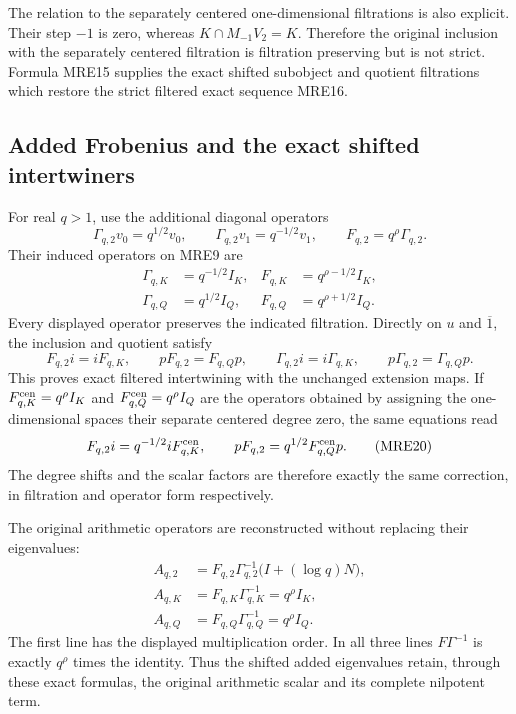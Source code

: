 The relation to the separately centered one-dimensional filtrations is
also explicit. Their step \(-1\) is zero, whereas
\(K\cap M_{-1}V_2=K\). Therefore the original inclusion with the separately
centered filtration is filtration preserving but is not strict. Formula
MRE15 supplies the exact shifted subobject and quotient filtrations
which restore the strict filtered exact sequence MRE16.

\subsection{Added Frobenius and the exact shifted intertwiners}

For real \(q>1\), use the additional diagonal operators
\[
 \Gamma_{q,2}v_0=q^{1/2}v_0,\qquad
 \Gamma_{q,2}v_1=q^{-1/2}v_1,\qquad
 F_{q,2}=q^\rho\Gamma_{q,2}.
 \tag{MRE17}
\]
Their induced operators on MRE9 are
\[
 \begin{aligned}
 \Gamma_{q,K}&=q^{-1/2}I_K,&
 F_{q,K}&=q^{\rho-1/2}I_K,\\
 \Gamma_{q,Q}&=q^{1/2}I_Q,&
 F_{q,Q}&=q^{\rho+1/2}I_Q.
 \end{aligned}
 \tag{MRE18}
\]
Every displayed operator preserves the indicated filtration. Directly on
\(u\) and \(\overline{1}\), the inclusion and quotient satisfy
\[
 F_{q,2}i=iF_{q,K},\qquad pF_{q,2}=F_{q,Q}p,
 \qquad
 \Gamma_{q,2}i=i\Gamma_{q,K},\qquad
 p\Gamma_{q,2}=\Gamma_{q,Q}p.
 \tag{MRE19}
\]
This proves exact filtered intertwining with the unchanged extension maps.
If \(F_{q,K}^{\rm cen}=q^\rho I_K\) and
\(F_{q,Q}^{\rm cen}=q^\rho I_Q\) are the operators obtained by assigning
the one-dimensional spaces their separate centered degree zero, the
same equations read
\[
 F_{q,2}i=q^{-1/2}iF_{q,K}^{\rm cen},\qquad
 pF_{q,2}=q^{1/2}F_{q,Q}^{\rm cen}p.
 \tag{MRE20}
\]
The degree shifts and the scalar factors are therefore exactly the same
correction, in filtration and operator form respectively.

The original arithmetic operators are reconstructed without replacing
their eigenvalues:
\[
 \begin{aligned}
 A_{q,2}&=F_{q,2}\Gamma_{q,2}^{-1}
                       \bigl(I+(\log q)N\bigr),\\
 A_{q,K}&=F_{q,K}\Gamma_{q,K}^{-1}=q^\rho I_K,\\
 A_{q,Q}&=F_{q,Q}\Gamma_{q,Q}^{-1}=q^\rho I_Q.
 \end{aligned}
 \tag{MRE21}
\]
The first line has the displayed multiplication order. In all three
lines \(F\Gamma^{-1}\) is exactly \(q^\rho\) times the identity.
Thus the shifted added eigenvalues retain, through these exact formulas,
the original arithmetic scalar and its complete nilpotent term.

